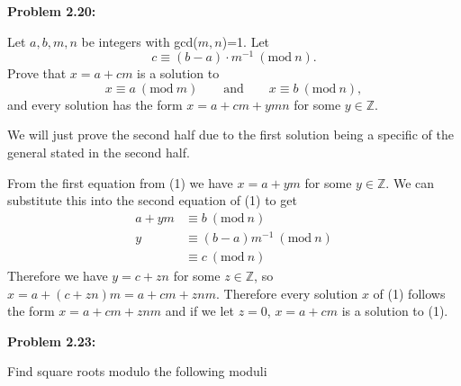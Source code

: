 \documentclass[a4paper, 11pt]{article}
\newcommand{\Mod}[1]{\ (\mathrm{mod}\ #1)}
\begin{document}
\noindent\textbf{Problem 2.20:}

    Let $a,b,m,n$ be integers with gcd($m,n$)=1. Let
    $$c\equiv (b-a)\cdot m^{-1} \Mod{n}.$$
    Prove that $x=a+cm$ is a solution to 
    \begin{equation}
        x\equiv a \Mod{m} \qquad \text{and} \qquad x\equiv b\Mod{n},    
    \end{equation}
    and every solution has the form $x=a+cm+ymn$ for some $y\in\mathbb{Z}$.
    
    We will just prove the second half due to the first solution being a specific of the general stated in the second half. 
    
    From the first equation from (1) we have $x=a+ym$ for some $y\in\mathbb{Z}$. We can substitute this into the second equation of (1) to get 
    \begin{align*}
        a+ym &\equiv b \Mod{n}\\
        y &\equiv (b-a)m^{-1} \Mod{n}\\
        &\equiv c \Mod{n}
    \end{align*}
    Therefore we have $y=c+zn$ for some $z\in\mathbb{Z}$, so $x=a+(c+zn)m=a+cm+znm$. Therefore every solution $x$ of (1) follows the form $x=a+cm+znm$ and if we let $z=0$, $x = a + cm$ is a solution to (1).
    
\noindent\textbf{Problem 2.23:}

    Find square roots modulo the following moduli
\end{document}

